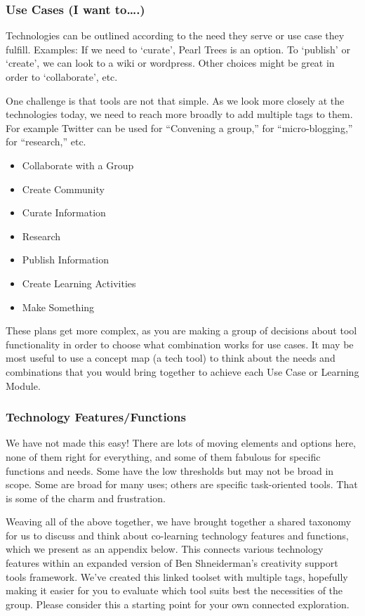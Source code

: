 \subsubsection{Use Cases (I want
to\ldots{}.)}\label{use-cases-i-want-to.}

Technologies can be outlined according to the need they serve or use
case they fulfill. Examples: If we need to `curate', Pearl Trees is an
option. To `publish' or `create', we can look to a wiki or wordpress.
Other choices might be great in order to `collaborate', etc.

One challenge is that tools are not that simple. As we look more closely
at the technologies today, we need to reach more broadly to add multiple
tags to them. For example Twitter can be used for ``Convening a group,''
for ``micro-blogging,'' for ``research,'' etc.

\begin{itemize}
\itemsep1pt\parskip0pt
\item
  Collaborate with a Group
\item
  Create Community
\item
  Curate Information
\item
  Research
\item
  Publish Information
\item
  Create Learning Activities
\item
  Make Something
\end{itemize}

These plans get more complex, as you are making a group of decisions
about tool functionality in order to choose what combination works for
use cases. It may be most useful to use a concept map (a tech tool) to
think about the needs and combinations that you would bring together to
achieve each Use Case or Learning Module.

\subsubsection{Technology
Features/Functions}\label{technology-featuresfunctions}

We have not made this easy! There are lots of moving elements and
options here, none of them right for everything, and some of them
fabulous for specific functions and needs. Some have the low thresholds
but may not be broad in scope. Some are broad for many uses; others are
specific task-oriented tools. That is some of the charm and frustration.

Weaving all of the above together, we have brought together a shared
taxonomy for us to discuss and think about co-learning technology
features and functions, which we present as an appendix below. This
connects various technology features within an expanded version of Ben
Shneiderman's creativity support tools framework. We've created this
linked toolset with multiple tags, hopefully making it easier for you to
evaluate which tool suits best the necessities of the group. Please
consider this a starting point for your own connected exploration.

